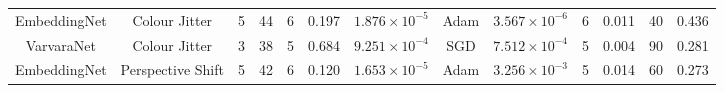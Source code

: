 \begin{table}[!t]
{\begin{tabular}{ccccccccccccc}
			EmbeddingNet                                                       & Colour Jitter                                                                    & 5                                                                 & 44                                                                                     & 6                                                                                             & 0.197            & $1.876\times10^{-5}$                                                          & Adam               & $3.567\times10^{-6}$                                                                             & 6                                                                                 & 0.011             & 40                                                                & 0.436                                                                             \\
			VarvaraNet                                                         & Colour Jitter                                                                    & 3                                                                 & 38                                                                                     & 5                                                                                             & 0.684            & $9.251\times10^{-4}$                                                          & SGD                & $7.512\times10^{-4}$                                                                             & 5                                                                                 & 0.004             & 90                                                                & 0.281                                                                             \\
			EmbeddingNet                                                       & Perspective Shift                                                                & 5                                                                 & 42                                                                                     & 6                                                                                             & 0.120            & $1.653\times10^{-5}$                                                          & Adam               & $3.256\times10^{-3}$                                                                             & 5                                                                                 & 0.014             & 60                                                                & 0.273                                                                             \\

\end{tabular}}
\end{table}
